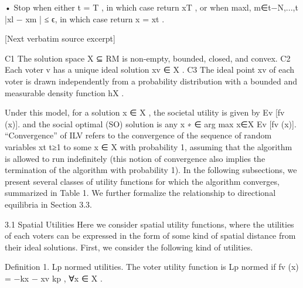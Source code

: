 \documentclass[10pt]{article}
\begin{document}
\begin{ReviewVerbatim}
       • Stop when either t = T , in which case return xT , or when
         maxl, m∈{t−N,...,t} |xl − xm | ≤ ϵ, in which case return x = xt .

[Next verbatim source excerpt]

 C1 The solution space X ⊆ RM is non-empty, bounded, closed, and convex.
 C2 Each voter v has a unique ideal solution xv ∈ X .
 C3 The ideal point xv of each voter is drawn independently from a probability distribution
      with a bounded and measurable density function hX .


Under this model, for a solution x ∈ X , the societal utility is given by Ev [fv (x)]. and the
social optimal (SO) solution is any x
                                         ∗ ∈ arg max
                                                    x∈X Ev [fv (x)].
   “Convergence” of    ILV refers to the convergence of the sequence of random variables
{xt }t≥1 to some x ∈ X with probability 1, assuming that the algorithm is allowed to run
indefinitely (this notion of convergence also implies the termination of the algorithm with
probability 1).
   In the following subsections, we present several classes of utility functions for which
the algorithm converges, summarized in Table 1. We further formalize the relationship to
directional equilibria in Section 3.3.


3.1 Spatial Utilities
Here we consider spatial utility functions, where the utilities of each voters can be expressed
in the form of some kind of spatial distance from their ideal solutions. First, we consider
the following kind of utilities.


Definition 1. Lp normed utilities. The voter utility function is Lp normed if fv (x) =
−kx − xv kp , ∀x ∈ X .
\end{ReviewVerbatim}
\end{document}
